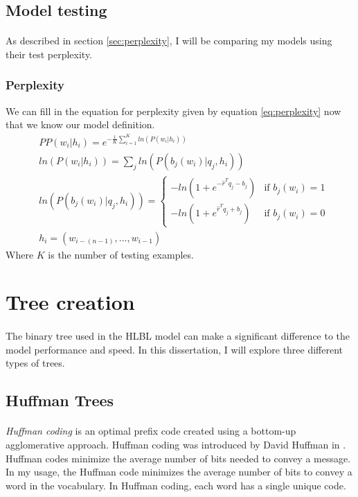 \subsection{Model testing}
\paragraph{}
As described in section \ref{sec:perplexity}, I will be comparing my models using their test perplexity.
\subsubsection{Perplexity}
We can fill in the equation for perplexity given by equation \ref{eq:perplexity} now that we know our model definition.
\begin{align}
&PP(w_i | h_i)=e^{- \frac{1}{K} \sum_{i=1}^K ln( P(w_i | h_i) ) }
\\
&ln(P(w_i | h_i )) = \sum_j ln(P(b_j(w_i) | q_j, h_i)) \nonumber
\\
&ln(P(b_j(w_i) | q_j, h_i)) =  
\begin{cases}
  -ln (1 + e^{-\hat{r}^T q_{j} -b_{j}}) & \text{if } b_j(w_i)  = 1 \\
  -ln (1 + e^{\hat{r}^T q_{j} +b_{j}})     & \text{if } b_j(w_i) = 0
  \end{cases} \nonumber
\\
 & h_i = ( w_{i-(n-1)},\dots, w_{i-1} ) \nonumber
\end{align}
Where $K$ is the number of testing examples. 


\section{Tree creation} \label{sec:treeCreation}
\paragraph{}
The binary tree used in the HLBL model can make a significant difference to the model performance and speed. In this dissertation, I will explore three different types of trees.
\subsection{Huffman Trees}
\paragraph{}
\emph{Huffman coding} is an optimal prefix code created using a bottom-up agglomerative approach. Huffman coding was introduced by David Huffman in \cite{Huffman1952}. Huffman codes minimize the average number of bits needed to convey a message. In my usage, the Huffman code minimizes the average number of bits to convey a word in the vocabulary. In Huffman coding, each word has a single unique code.
